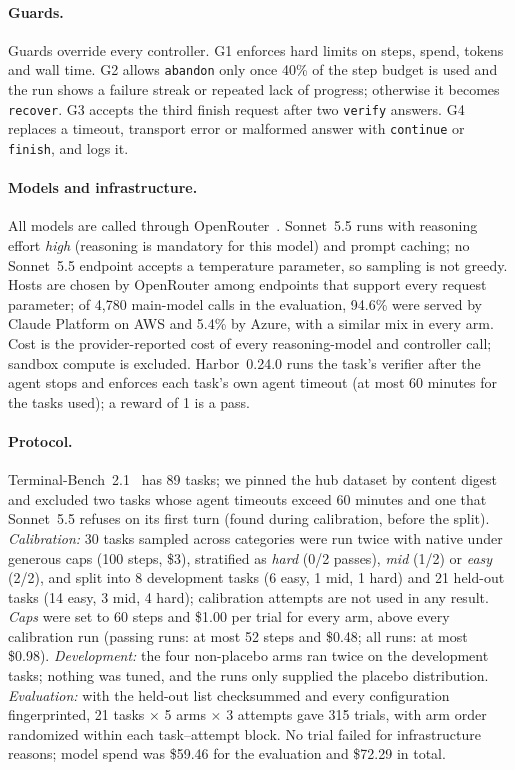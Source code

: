 \documentclass[10pt]{article}
\begin{document}
\paragraph{Guards.}
Guards override every controller.
G1 enforces hard limits on steps, spend, tokens and wall time.
G2 allows \texttt{abandon} only once 40\% of the step budget is used and the run shows a failure streak or repeated lack of progress; otherwise it becomes \texttt{recover}.
G3 accepts the third finish request after two \texttt{verify} answers.
G4 replaces a timeout, transport error or malformed answer with \texttt{continue} or \texttt{finish}, and logs it.

\paragraph{Models and infrastructure.}
All models are called through OpenRouter~\citep{openrouter}.
Sonnet~5.5 runs with reasoning effort \emph{high} (reasoning is mandatory for this model) and prompt caching; no Sonnet~5.5 endpoint accepts a temperature parameter, so sampling is not greedy.
Hosts are chosen by OpenRouter among endpoints that support every request parameter; of 4{,}780 main-model calls in the evaluation, 94.6\% were served by Claude Platform on AWS and 5.4\% by Azure, with a similar mix in every arm.
Cost is the provider-reported cost of every reasoning-model and controller call; sandbox compute is excluded.
Harbor~0.24.0 runs the task's verifier after the agent stops and enforces each task's own agent timeout (at most 60 minutes for the tasks used); a reward of 1 is a pass.

\paragraph{Protocol.}
Terminal-Bench~2.1~\citep{tbench21} has 89 tasks; we pinned the hub dataset by content digest and excluded two tasks whose agent timeouts exceed 60 minutes and one that Sonnet~5.5 refuses on its first turn (found during calibration, before the split).
\emph{Calibration:} 30 tasks sampled across categories were run twice with native under generous caps (100 steps, \$3), stratified as \emph{hard} (0/2 passes), \emph{mid} (1/2) or \emph{easy} (2/2), and split into 8 development tasks (6 easy, 1 mid, 1 hard) and 21 held-out tasks (14 easy, 3 mid, 4 hard); calibration attempts are not used in any result.
\emph{Caps} were set to 60 steps and \$1.00 per trial for every arm, above every calibration run (passing runs: at most 52 steps and \$0.48; all runs: at most \$0.98).
\emph{Development:} the four non-placebo arms ran twice on the development tasks; nothing was tuned, and the runs only supplied the placebo distribution.
\emph{Evaluation:} with the held-out list checksummed and every configuration fingerprinted, 21 tasks $\times$ 5 arms $\times$ 3 attempts gave 315 trials, with arm order randomized within each task--attempt block.
No trial failed for infrastructure reasons; model spend was \$59.46 for the evaluation and \$72.29 in total.
\end{document}
